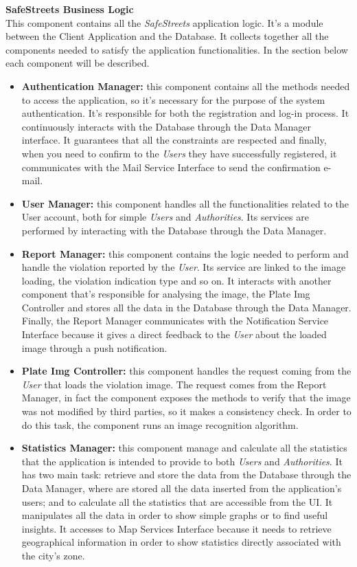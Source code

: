 \documentclass{article}
\begin{document}
		{\bf SafeStreets Business Logic} \\
		This component contains all the {\it SafeStreets} application logic. It's a module between the Client Application and the Database. It collects together all the components needed to satisfy the application functionalities. In the section below each component will be described.
		\begin{itemize}
		\item {\bf Authentication Manager:} this component contains all the methods needed to access the application, so it's necessary for the purpose of the system authentication. It's responsible for both the registration and log-in process. It continuously interacts with the Database through the Data Manager interface. It guarantees that all the constraints are respected and finally, when you need to confirm to the {\it Users} they have successfully registered, it communicates with the Mail Service Interface to send the confirmation e-mail. 
		\item {\bf User Manager:} this component handles all the functionalities related to the User account, both for simple {\it Users} and {\it Authorities}. Its services are performed by interacting with the Database through the Data Manager. 
		\item {\bf Report Manager:} this component contains the logic needed to perform and handle the violation reported by the {\it User}. Its service are linked to the image loading, the violation indication type and so on. It interacts with another component that's responsible for analysing the image, the Plate Img Controller and stores all the data in the Database through the Data Manager.  Finally, the Report Manager communicates with the Notification Service Interface because it gives a direct feedback to the {\it User} about the loaded image through a push notification.
		\item {\bf Plate Img Controller:} this component handles the request coming from the {\it User} that loads the violation image. The request comes from the Report Manager, in fact the component exposes the methods to verify that the image was not modified by third parties, so it makes a consistency check. In order to do this task, the component runs an image recognition algorithm.
		\item {\bf Statistics Manager:} this component manage and calculate all the statistics that the application is intended to provide to both {\it Users} and {\it Authorities}. It has two main task: retrieve and store the data from the Database through the Data Manager, where are stored all the data inserted from the application's users; and to calculate all the statistics that are accessible from the UI. It manipulates all the data in order to show simple graphs or to find useful insights. It accesses to Map Services Interface because it needs to retrieve geographical information in order to show statistics directly associated with the city's zone.

\end{itemize}
\end{document}
